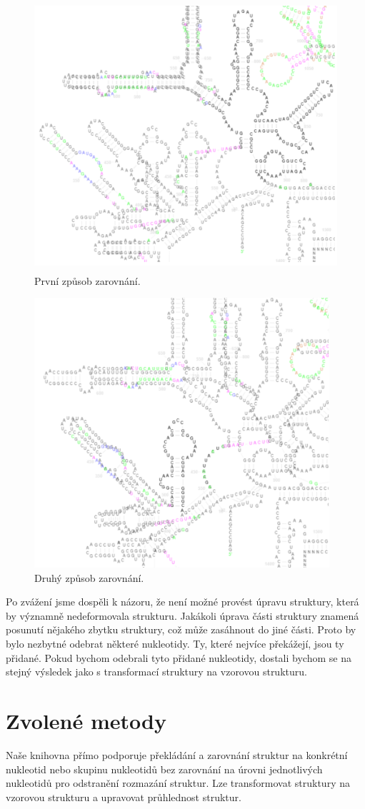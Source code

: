 \begin{figure}[H]
  \centering
  \includegraphics[height=100mm]{../img/kap02/tree/align1.png}
  \caption{První způsob zarovnání.}
\end{figure}

\begin{figure}[H]
  \centering
  \includegraphics[height=100mm]{../img/kap02/tree/align2.png}
  \caption{Druhý způsob zarovnání.}
\end{figure}

Po zvážení jsme dospěli k názoru, že není možné provést úpravu struktury, která
by významně nedeformovala strukturu. Jakákoli úprava části struktury znamená
posunutí nějakého zbytku struktury, což může zasáhnout do jiné části. Proto by
bylo nezbytné odebrat některé nukleotidy. Ty, které nejvíce překážejí, jsou ty
přidané. Pokud bychom odebrali tyto přidané nukleotidy, dostali bychom se na
stejný výsledek jako s transformací struktury na vzorovou strukturu.

\section{Zvolené metody}

Naše knihovna přímo podporuje překládání a zarovnání struktur na konkrétní
nukleotid nebo skupinu nukleotidů bez zarovnání na úrovni jednotlivých
nukleotidů pro odstranění rozmazání struktur. Lze transformovat struktury na
vzorovou strukturu a upravovat průhlednost struktur.
